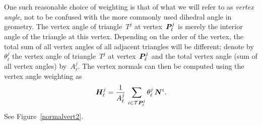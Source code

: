 \documentclass[11pt]{article}
\newcommand{\vct}{\vectorsym}
\newcommand{\cT}{\mathcal T}
\begin{document}
One such reasonable choice of weighting is that of what we will refer
to as \emph{vertex angle}, not to be confused with the more commonly
used dihedral angle in geometry. The vertex angle of triangle~$T^j$
at vertex~$\vct{P}^j_\ell$ is merely the interior angle of the
triangle at this vertex. Depending on the order of the vertex, the
total sum of all vertex angles of all adjacent triangles will be
different; denote by $\theta^j_\ell$ the vertex angle of
triangle~$T^j$ at vertex~$\vct{P}^j_\ell$ and the total vertex angle
(sum of all vertex angles) by~$A^j_\ell$. The vertex normals can then
be computed using the vertex angle weighting as
\begin{equation}
  \vct{H}^j_\ell = \frac{1}{ A^j_\ell} \, 
  \sum_{i \in \cT \vct{P}^j_\ell} 
  \theta^j_\ell \,  \vct{N}^i.
\end{equation}
See Figure~\ref{normalvert2}.
\end{document}
